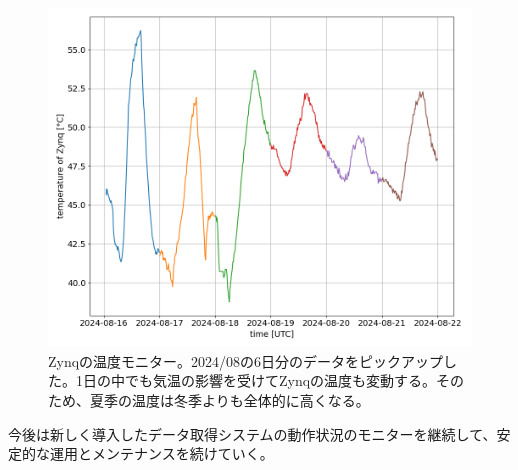 \begin{figure}[htbp]
  \centering
  \includegraphics[width=0.9\columnwidth]{4_elDAQ/figs/temp_zynq_202408.png}
  \caption{Zynqの温度モニター。2024/08の6日分のデータをピックアップした。1日の中でも気温の影響を受けてZynqの温度も変動する。そのため、夏季の温度は冬季よりも全体的に高くなる。}
  \label{temp_zynq}
\end{figure}

今後は新しく導入したデータ取得システムの動作状況のモニターを継続して、安定的な運用とメンテナンスを続けていく。
